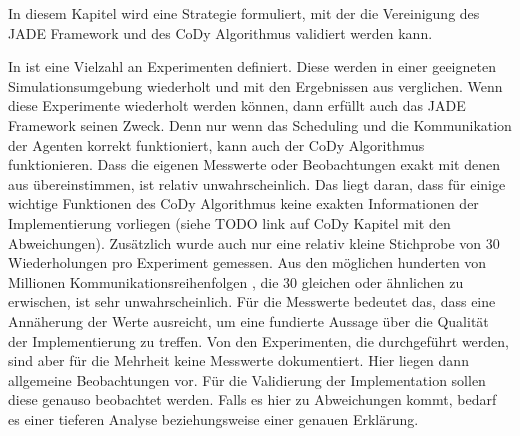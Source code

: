 In diesem Kapitel wird eine Strategie formuliert, mit der die Vereinigung des JADE Framework und des CoDy Algorithmus validiert werden kann.

In \cite{book:regele} ist eine Vielzahl an Experimenten definiert. Diese werden in einer geeigneten Simulationsumgebung wiederholt und mit den Ergebnissen aus \cite{book:regele} verglichen. Wenn diese Experimente wiederholt werden können, dann erfüllt auch das JADE Framework seinen Zweck. Denn nur wenn das Scheduling und die Kommunikation der Agenten korrekt funktioniert, kann auch der CoDy Algorithmus funktionieren. Dass die eigenen Messwerte oder Beobachtungen exakt mit denen aus \cite{book:regele} übereinstimmen, ist relativ unwahrscheinlich. Das liegt daran, dass für einige wichtige Funktionen des CoDy Algorithmus keine exakten Informationen der Implementierung vorliegen (siehe TODO link auf CoDy Kapitel mit den Abweichungen). Zusätzlich wurde auch nur eine relativ kleine Stichprobe von 30 Wiederholungen pro Experiment gemessen. Aus den möglichen hunderten von Millionen Kommunikationsreihenfolgen \cite{book:regele}, die 30 gleichen oder ähnlichen zu erwischen, ist sehr unwahrscheinlich. Für die Messwerte bedeutet das, dass eine Annäherung der Werte ausreicht, um eine fundierte Aussage über die Qualität der Implementierung zu treffen. Von den Experimenten, die durchgeführt werden, sind aber für die Mehrheit keine Messwerte dokumentiert. Hier liegen dann allgemeine Beobachtungen vor. Für die Validierung der Implementation sollen diese genauso beobachtet werden. Falls es hier zu Abweichungen kommt, bedarf es einer tieferen Analyse beziehungsweise einer genauen Erklärung.